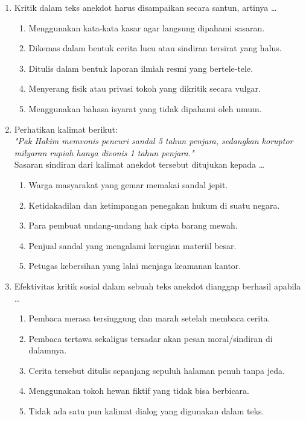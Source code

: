 \documentclass[12pt,a4paper]{article}
\begin{document}
\begin{enumerate}[leftmargin=*]
\item Kritik dalam teks anekdot harus disampaikan secara santun, artinya \dots
    \begin{enumerate}[label=\alph*.]
        \item Menggunakan kata-kata kasar agar langsung dipahami sasaran.
        \item Dikemas dalam bentuk cerita lucu atau sindiran tersirat yang halus.
        \item Ditulis dalam bentuk laporan ilmiah resmi yang bertele-tele.
        \item Menyerang fisik atau privasi tokoh yang dikritik secara vulgar.
        \item Menggunakan bahasa isyarat yang tidak dipahami oleh umum.
    \end{enumerate}

\item Perhatikan kalimat berikut:\\
\textit{"Pak Hakim memvonis pencuri sandal 5 tahun penjara, sedangkan koruptor milyaran rupiah hanya divonis 1 tahun penjara."}\\
Sasaran sindiran dari kalimat anekdot tersebut ditujukan kepada \dots
    \begin{enumerate}[label=\alph*.]
        \item Warga masyarakat yang gemar memakai sandal jepit.
        \item Ketidakadilan dan ketimpangan penegakan hukum di suatu negara.
        \item Para pembuat undang-undang hak cipta barang mewah.
        \item Penjual sandal yang mengalami kerugian materiil besar.
        \item Petugas kebersihan yang lalai menjaga keamanan kantor.
    \end{enumerate}

\item Efektivitas kritik sosial dalam sebuah teks anekdot dianggap berhasil apabila \dots
    \begin{enumerate}[label=\alph*.]
        \item Pembaca merasa tersinggung dan marah setelah membaca cerita.
        \item Pembaca tertawa sekaligus tersadar akan pesan moral/sindiran di dalamnya.
        \item Cerita tersebut ditulis sepanjang sepuluh halaman penuh tanpa jeda.
        \item Menggunakan tokoh hewan fiktif yang tidak bisa berbicara.
        \item Tidak ada satu pun kalimat dialog yang digunakan dalam teks.
    \end{enumerate}


\end{enumerate}
\end{document}

